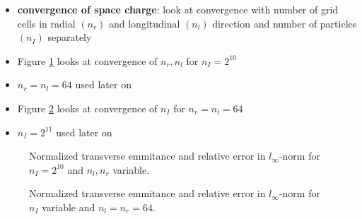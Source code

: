 \begin{itemize}
   \item \textbf{convergence of space charge}: look at convergence with number of grid cells in radial $(n_r)$ and longitudinal $(n_l)$ direction and number of particles $(n_I)$ separately

   \item Figure \ref{fig:sc_cvg_rl} looks at convergence of $n_r, n_l$ for $n_I=2^{10}$
   \item $n_r=n_l=64$ used later on

   \item Figure \ref{fig:sc_cvg_I} looks at convergence of $n_I$ for $n_r=n_l=64$
   \item $n_I=2^{11}$ used later on
\end{itemize}

\begin{center}
\begin{figure}[H]
   \begin{subfigure}{0.4\textwidth}
      
   \end{subfigure}
   \qquad \qquad \qquad
   \begin{subfigure}{0.4\textwidth}
      
   \end{subfigure}
   \caption{Normalized transverse emmitance and relative error in $l_\infty$-norm for $n_I=2^{10}$ and $n_l, n_r$ variable.}
   \label{fig:sc_cvg_rl}
\end{figure}
\end{center}

\begin{center}
\begin{figure}[H]
   \begin{subfigure}{0.4\textwidth}
      
   \end{subfigure}
   \qquad \qquad \qquad
   \begin{subfigure}{0.4\textwidth}
      
   \end{subfigure}
   \caption{Normalized transverse emmitance and relative error in $l_\infty$-norm for $n_I$ variable and $n_l=n_r=64$.}
   \label{fig:sc_cvg_I}
\end{figure}
\end{center}

